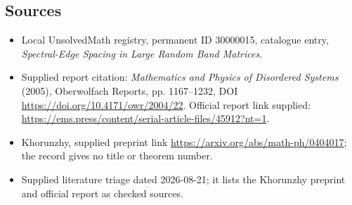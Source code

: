 \documentclass[11pt]{article}
\begin{document}
\subsection{Sources}
\begin{itemize}
\item Local UnsolvedMath registry, permanent ID 30000015, catalogue entry, \emph{Spectral-Edge Spacing in Large Random Band Matrices}.
\item Supplied report citation: \emph{Mathematics and Physics of Disordered Systems} (2005), Oberwolfach Reports, pp. 1167--1232, DOI \url{https://doi.org/10.4171/owr/2004/22}. Official report link supplied: \url{https://ems.press/content/serial-article-files/45912?nt=1}.
\item Khorunzhy, supplied preprint link \url{https://arxiv.org/abs/math-ph/0404017}; the record gives no title or theorem number.
\item Supplied literature triage dated 2026-08-21; it lists the Khorunzhy preprint and official report as checked sources.
\end{itemize}
\end{document}
